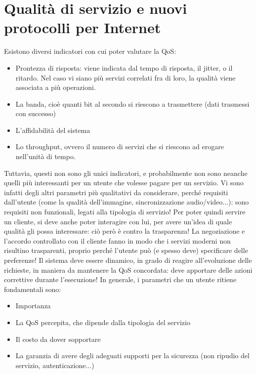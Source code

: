 \section{Qualità di servizio e nuovi protocolli per Internet}
Esistono diversi indicatori con cui poter valutare la QoS:
\begin{itemize}
 \item Prontezza di risposta: viene indicata dal tempo di risposta, il jitter, o il ritardo. Nel caso vi siano più
servizi correlati fra di loro, la qualità viene associata a più operazioni.
 \item La banda, cioè quanti bit al secondo si riescono a trasmettere (dati trasmessi con successo)
 \item L'affidabilità del sistema
 \item Lo throughput, ovvero il numero di servizi che si riescono ad erogare nell'unità di tempo.
\end{itemize}
Tuttavia, questi non sono gli unici indicatori, e probabilmente non sono neanche quelli più interessanti per un utente
che volesse pagare per un servizio. Vi sono infatti degli altri parametri più qualitativi da considerare, perché
requisiti dall'utente (come la qualità dell'immagine, sincronizzazione audio/video...): sono requisiti non funzionali,
legati alla tipologia di servizio! Per poter quindi servire un cliente, si deve anche poter interagire con lui, per
avere un'idea di quale qualità gli possa interessare: ciò però è contro la trasparenza! La negoziazione e l'accordo
controllato con il cliente fanno in modo che i servizi moderni non risultino trasparenti, proprio perché l'utente può
(e spesso deve) specificare delle preferenze! Il sistema deve essere dinamico, in grado di reagire all'evoluzione
delle richieste, in maniera da mantenere la QoS concordata: deve apportare delle azioni correttive durante l'esecuzione!
In generale, i parametri che un utente ritiene fondamentali sono:
\begin{itemize}
 \item Importanza
 \item La QoS percepita, che dipende dalla tipologia del servizio
 \item Il costo da dover sopportare
 \item La garanzia di avere degli adeguati supporti per la sicurezza (non ripudio del servizio, autenticazione...)
\end{itemize}

